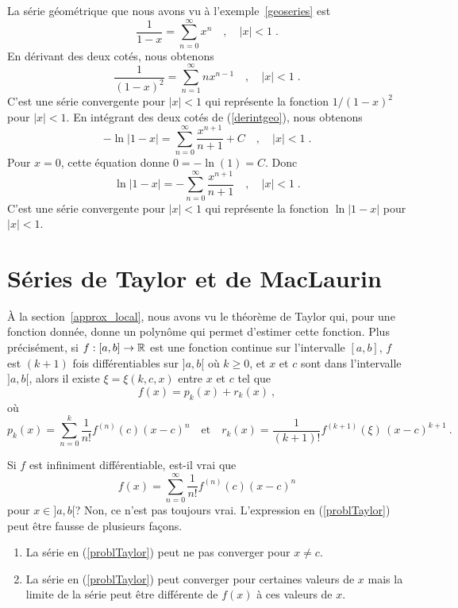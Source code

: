 {\begin{egg}
La série géométrique que nous avons vu à l'exemple~\ref{geoseries} est
\begin{equation}\label{derintgeo}
\frac{1}{1-x} = \sum_{n=0}^\infty x^n  \quad , \quad |x|<1 \; .
\end{equation}
En dérivant des deux cotés, nous obtenons
\[
\frac{1}{(1-x)^2} = \sum_{n=1}^\infty nx^{n-1}  \quad , \quad |x|<1 \; .
\]
C'est une série convergente pour $|x|<1$ qui représente la fonction
$1/(1-x)^2$ pour $|x|<1$.  En intégrant des deux cotés de
(\ref{derintgeo}), nous obtenons
\[
- \ln|1-x| = \sum_{n=0}^\infty \frac{x^{n+1}}{n+1} + C
  \quad , \quad |x|<1 \; .
\]
Pour $x=0$, cette équation donne $0 = -\ln(1) = C$.  Donc
\[
\ln|1-x| = - \sum_{n=0}^\infty \frac{x^{n+1}}{n+1}   \quad , \quad |x|<1 \; .
\]
C'est une série convergente pour $|x|<1$ qui représente la
fonction $\ln|1-x|$ pour $|x|<1$.
\end{egg}

\section{Séries de Taylor et de MacLaurin}

À la section~\ref{approx_local}, nous avons vu le théorème de Taylor
qui, pour une fonction donnée, donne un polynôme qui permet d'estimer
cette fonction.  Plus 
précisément, si $f:[a,b]\rightarrow \mathbb{R}$ est une fonction continue sur
l'intervalle $[a,b]$, $f$ est $(k+1)$ fois différentiables sur $]a,b[$ où
$k\geq 0$, et $x$ et $c$ sont dans l'intervalle $]a,b[$, alors il existe
$\xi = \xi(k,c,x)$ entre $x$ et $c$ tel que
\begin{equation}\label{TPfourTS1}
f(x) = p_k(x) + r_k(x)  \ ,
\end{equation}
où
\begin{equation}\label{TPfourTS2}
p_k(x) = \sum_{n=0}^k \frac{1}{n!} f^{(n)}(c)(x-c)^n
\quad \text{et} \quad
r_k(x) = \frac{1}{(k+1)!} f^{(k+1)}(\xi)\, (x-c)^{k+1} \ . 
\end{equation}

Si $f$ est infiniment différentiable, est-il vrai que
\begin{equation}\label{problTaylor}
f(x) = \sum_{n=0}^\infty \frac{1}{n!} f^{(n)}(c)(x-c)^n
\end{equation}
pour $x \in ]a,b[$?  Non, ce n'est pas toujours vrai.  L'expression en
(\ref{problTaylor}) peut être fausse de plusieurs façons.
\begin{enumerate}
\item La série en (\ref{problTaylor}) peut ne pas converger pour $x\neq c$.
\item La série en (\ref{problTaylor}) peut converger pour certaines valeurs
de $x$ mais la limite de la série peut être différente de $f(x)$ à ces
valeurs de $x$.
\end{enumerate}

}
